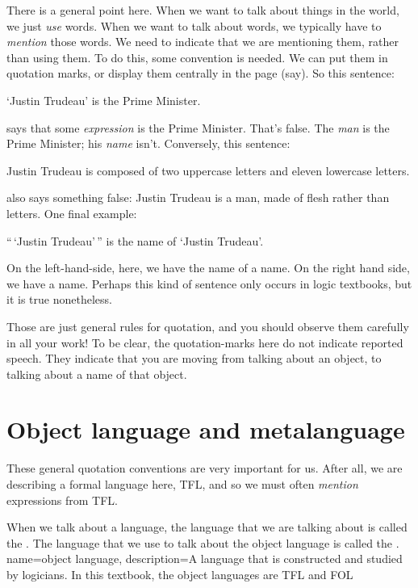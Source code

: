 There is a general point here. When we want to talk about things in the world, we just \emph{use} words. When we want to talk about words, we typically have to \emph{mention} those words. We need to indicate that we are mentioning them, rather than using them. To do this, some convention is needed. We can put them in quotation marks, or display them centrally in the page (say). So this sentence:
	\begin{ebullet}
		\item `Justin Trudeau' is the Prime Minister.
	\end{ebullet}
says that some \emph{expression} is the Prime Minister. That's false. The \emph{man} is the Prime Minister; his \emph{name} isn't. Conversely, this sentence:
	\begin{ebullet}
		\item Justin Trudeau is composed of two uppercase letters and eleven lowercase letters.
	\end{ebullet}
also says something false: Justin Trudeau is a man, made of flesh rather than letters. One final example:
	\begin{ebullet}
		\item ``\,`Justin Trudeau'\,'' is the name of `Justin Trudeau'.
	\end{ebullet} 
On the left-hand-side, here, we have the name of a name. On the right hand side, we have a name. Perhaps this kind of sentence only occurs in logic textbooks, but it is true nonetheless.

Those are just general rules for quotation, and you should observe them carefully in all your work! To be clear, the quotation-marks here do not indicate reported speech. They indicate that you are moving from talking about an object, to talking about a name of that object.


\section{Object language and metalanguage}
These general quotation conventions are very important for us. After all, we are describing a formal language here, TFL, and so we must often \emph{mention} expressions from TFL.

When we talk about a language, the language that we are talking about is called the . The language that we use to talk about the object language is called the .
\label{def.metalanguage}
{
name=object language,
description={A language that is constructed and studied by logicians. In this textbook,
 the object languages are TFL and FOL}
}

